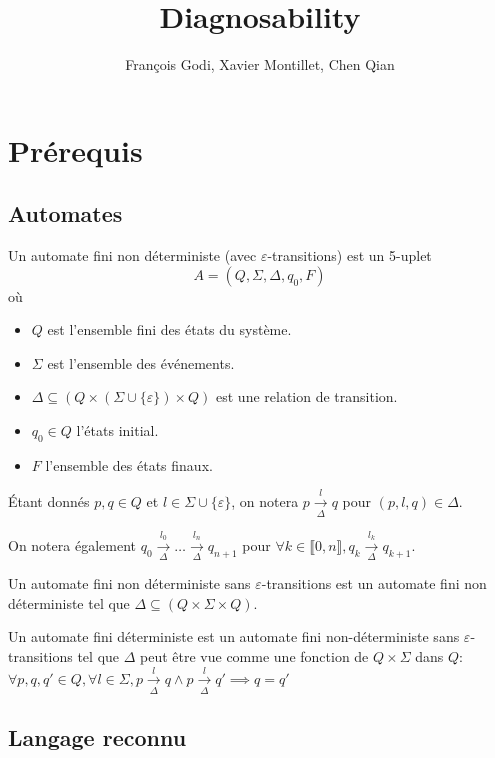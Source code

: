 \documentclass[10pt,a4paper]{article}
\newcommand{\enum}[2]{\llbracket #1, #2 \rrbracket}
\begin{document}
    \title{Diagnosability}

    \author{François Godi, Xavier Montillet, Chen Qian}

\section{Pr\'erequis}

\subsection{Automates}

Un automate fini non déterministe (avec $\varepsilon$-transitions) est un 5-uplet
$$A = (Q, \Sigma, \Delta, q_0, F)$$
o\`u
\begin{itemize}
	\item $Q$ est l'ensemble fini des états du système.
	\item $\Sigma$ est l'ensemble des événements.
	\item $\Delta \subseteq (Q \times (\Sigma \cup \{\varepsilon\}) \times Q)$ est une relation de transition.
	\item $q_0 \in Q$ l'états initial.
	\item $F$ l'ensemble des \'etats finaux.
\end{itemize}

\'Etant donn\'es $p,q \in Q$ et $l\in \Sigma \cup \{\varepsilon\}$, on notera $p \overset{l}{\underset{\Delta}{\to}}q$ pour $(p,l,q) \in \Delta$.

On notera \'egalement $q_0 \overset{l_0}{\underset{\Delta}{\to}} \dots \overset{l_n}{\underset{\Delta}{\to}} q_{n+1}$ pour $\forall k \in \enum{0}{n}, q_k \overset{l_k}{\underset{\Delta}{\to}} q_{k+1}$.



Un automate fini non d\'eterministe sans $\varepsilon$-transitions est un automate fini non d\'eterministe tel que $\Delta \subseteq (Q\times \Sigma \times Q)$.

Un automate fini d\'eterministe est un automate fini non-d\'eterministe sans $\varepsilon$-transitions tel que $\Delta$ peut \^etre vue comme une fonction de $Q\times \Sigma$ dans $Q$: $\forall p,q,q' \in Q, \forall l \in \Sigma, p\overset{l}{\underset{\Delta}{\to}}q \land p\overset{l}{\underset{\Delta}{\to}}q' \implies q=q'$

\subsection{Langage reconnu}
\end{document}
